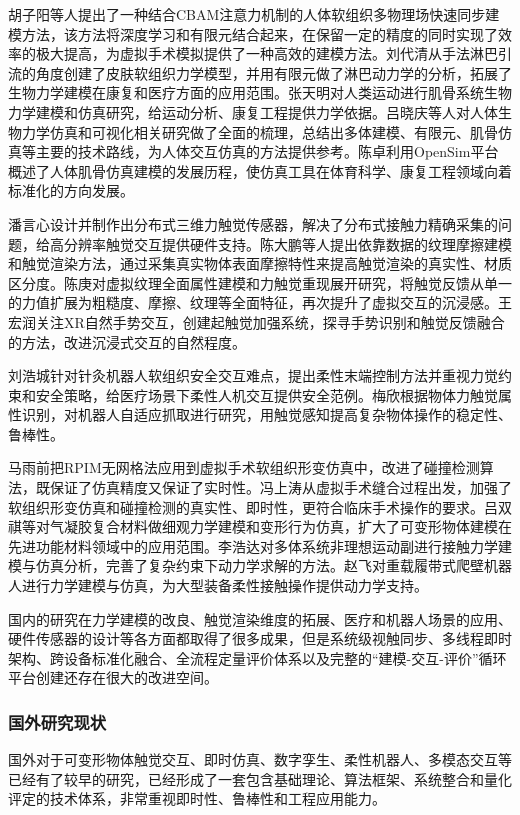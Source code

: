 胡子阳等人提出了一种结合CBAM注意力机制的人体软组织多物理场快速同步建模方法，该方法将深度学习和有限元结合起来，在保留一定的精度的同时实现了效率的极大提高，为虚拟手术模拟提供了一种高效的建模方法\cite{hu2025}。刘代清从手法淋巴引流的角度创建了皮肤软组织力学模型，并用有限元做了淋巴动力学的分析，拓展了生物力学建模在康复和医疗方面的应用范围\cite{liu2025}。张天明对人类运动进行肌骨系统生物力学建模和仿真研究，给运动分析、康复工程提供力学依据\cite{zhang2024a}。吕晓庆等人对人体生物力学仿真和可视化相关研究做了全面的梳理，总结出多体建模、有限元、肌骨仿真等主要的技术路线，为人体交互仿真的方法提供参考\cite{lv2023}。陈卓利用OpenSim平台概述了人体肌骨仿真建模的发展历程，使仿真工具在体育科学、康复工程领域向着标准化的方向发展\cite{chen2023}。

潘言心设计并制作出分布式三维力触觉传感器，解决了分布式接触力精确采集的问题，给高分辨率触觉交互提供硬件支持\cite{pan2024}。陈大鹏等人提出依靠数据的纹理摩擦建模和触觉渲染方法，通过采集真实物体表面摩擦特性来提高触觉渲染的真实性、材质区分度\cite{chen2025}。陈庚对虚拟纹理全面属性建模和力触觉重现展开研究，将触觉反馈从单一的力值扩展为粗糙度、摩擦、纹理等全面特征，再次提升了虚拟交互的沉浸感\cite{chen2024}。王宏润关注XR自然手势交互，创建起触觉加强系统，探寻手势识别和触觉反馈融合的方法，改进沉浸式交互的自然程度\cite{wang2025}。

刘浩城针对针灸机器人软组织安全交互难点，提出柔性末端控制方法并重视力觉约束和安全策略，给医疗场景下柔性人机交互提供安全范例\cite{liu2025a}。梅欣根据物体力触觉属性识别，对机器人自适应抓取进行研究，用触觉感知提高复杂物体操作的稳定性、鲁棒性\cite{mei2025}。

马雨前把RPIM无网格法应用到虚拟手术软组织形变仿真中，改进了碰撞检测算法，既保证了仿真精度又保证了实时性\cite{ma2024}。冯上涛从虚拟手术缝合过程出发，加强了软组织形变仿真和碰撞检测的真实性、即时性，更符合临床手术操作的要求\cite{feng2024}。吕双祺等对气凝胶复合材料做细观力学建模和变形行为仿真，扩大了可变形物体建模在先进功能材料领域中的应用范围\cite{lv2025}。李浩达对多体系统非理想运动副进行接触力学建模与仿真分析，完善了复杂约束下动力学求解的方法\cite{li2025}。赵飞对重载履带式爬壁机器人进行力学建模与仿真，为大型装备柔性接触操作提供动力学支持\cite{zhao2025}。

国内的研究在力学建模的改良、触觉渲染维度的拓展、医疗和机器人场景的应用、硬件传感器的设计等各方面都取得了很多成果，但是系统级视触同步、多线程即时架构、跨设备标准化融合、全流程定量评价体系以及完整的“建模-交互-评价”循环平台创建还存在很大的改进空间。

\subsubsection{国外研究现状}
国外对于可变形物体触觉交互、即时仿真、数字孪生、柔性机器人、多模态交互等已经有了较早的研究，已经形成了一套包含基础理论、算法框架、系统整合和量化评定的技术体系，非常重视即时性、鲁棒性和工程应用能力。

